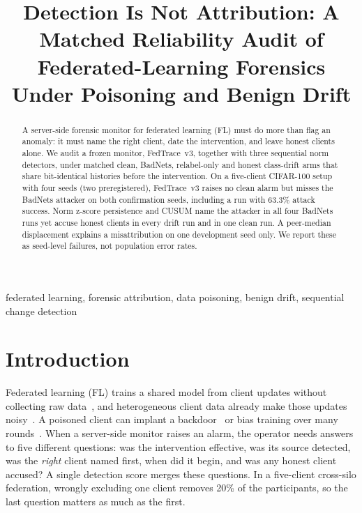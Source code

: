 \documentclass{article}
\title{Detection Is Not Attribution: A Matched Reliability Audit of\\ Federated-Learning Forensics Under Poisoning and Benign Drift}
\begin{document}
\ninept
\maketitle

\begin{abstract}
A server-side forensic monitor for federated learning (FL) must do more than flag an anomaly: it must name the right client, date the intervention, and leave honest clients alone. We audit a frozen monitor, FedTrace~v3, together with three sequential norm detectors, under matched clean, BadNets, relabel-only and honest class-drift arms that share bit-identical histories before the intervention. On a five-client CIFAR-100 setup with four seeds (two preregistered), FedTrace~v3 raises no clean alarm but misses the BadNets attacker on both confirmation seeds, including a run with 63.3\% attack success. Norm z-score persistence and CUSUM name the attacker in all four BadNets runs yet accuse honest clients in every drift run and in one clean run. A peer-median displacement explains a misattribution on one development seed only. We report these as seed-level failures, not population error rates.
\end{abstract}

\begin{keywords}
federated learning, forensic attribution, data poisoning, benign drift, sequential change detection
\end{keywords}

\section{Introduction}
\label{sec:intro}

Federated learning (FL) trains a shared model from client updates without collecting raw data~\cite{mcmahan2017fedavg}, and heterogeneous client data already make those updates noisy~\cite{li2020fedprox,karimireddy2020scaffold}. A poisoned client can implant a backdoor~\cite{gu2019badnets,bagdasaryan2020backdoor} or bias training over many rounds~\cite{xie2025poisonedfl}. When a server-side monitor raises an alarm, the operator needs answers to five different questions: was the intervention effective, was its source detected, was the \emph{right} client named first, when did it begin, and was any honest client accused? A single detection score merges these questions. In a five-client cross-silo federation, wrongly excluding one client removes 20\% of the participants, so the last question matters as much as the first.
\end{document}
